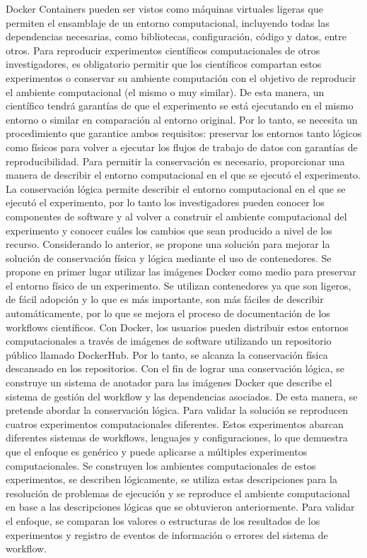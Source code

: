 Docker Containers pueden ser vistos como máquinas virtuales ligeras que permiten el ensamblaje de un entorno computacional, incluyendo todas las dependencias necesarias, como bibliotecas, configuración, código y datos, entre otros.
Para reproducir experimentos científicos computacionales de otros investigadores, es obligatorio permitir que los científicos compartan estos experimentos o conservar su ambiente computación con el objetivo de reproducir el ambiente computacional  (el mismo o muy similar).
De esta manera, un científico tendrá garantías de que el experimento se está ejecutando en el mismo entorno o similar en comparación al entorno original.
Por lo tanto, se necesita un procedimiento que garantice ambos requisitos: preservar los entornos tanto lógicos como físicos para volver a ejecutar los flujos de trabajo de datos con garantías de reproducibilidad.
Para permitir la conservación es necesario, proporcionar una manera de describir el entorno computacional en el que se ejecutó el experimento. 
La conservación lógica permite describir el entorno computacional en el que se ejecutó el experimento, por lo tanto los investigadores pueden conocer los componentes de software y al volver a construir el ambiente computacional del experimento y conocer cuáles los cambios que sean producido a nivel de los recurso.
Considerando lo anterior, se propone una solución para mejorar la solución de conservación física y lógica mediante el uso de contenedores.
Se propone en primer lugar utilizar las imágenes Docker como medio para preservar el entorno físico de un experimento. Se utilizan contenedores ya que son ligeros, de fácil adopción y lo que es más importante, son más fáciles de describir automáticamente, por lo que se mejora el proceso de documentación de los workflows científicos.
Con Docker, los usuarios pueden distribuir estos entornos computacionales a través de imágenes de software utilizando un repositorio público llamado DockerHub. Por lo tanto, se alcanza la conservación física descansado en los repositorios.
Con el fin de lograr una conservación lógica, se construye un sistema de anotador para las imágenes Docker que describe el sistema de gestión del workflow y las dependencias asociados. De esta manera, se pretende abordar la conservación lógica.
Para validar la solución se reproducen cuatros experimentos computacionales diferentes. Estos experimentos abarcan diferentes sistemas de workflows, lenguajes y configuraciones, lo que demuestra que el enfoque es genérico y puede aplicarse a múltiples experimentos computacionales.
Se construyen los ambientes computacionales de estos experimentos, se describen lógicamente, se utiliza estas descripciones para la resolución de problemas de ejecución y se reproduce el ambiente computacional en base a las descripciones lógicas que se obtuvieron anteriormente.
Para validar el enfoque, se comparan los valores o estructuras de los resultados de los experimentos y registro de eventos de información o errores del sistema de workflow.